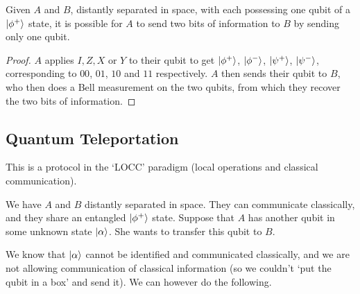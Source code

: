 \documentclass[a4paper]{article}
\begin{document}
\begin{theorem}
	Given $A$ and $B$, distantly separated in space, with each possessing one qubit of a $\ket{\phi^+}$ state, it is possible for $A$ to send two bits of information to $B$ by sending only one qubit.
\end{theorem}
\begin{proof}
	$A$ applies $I, Z, X$ or $Y$ to their qubit to get $\ket{\phi^+}$, $\ket{\phi^-}$, $\ket{\psi^+}$, $\ket{\psi^-}$, corresponding to $00$, $01$, $10$ and $11$ respectively. $A$ then sends their qubit to $B$, who then does a Bell measurement on the two qubits, from which they recover the two bits of information.
\end{proof}

\subsection{Quantum Teleportation}

This is a protocol in the `LOCC' paradigm (local operations and classical communication).

We have $A$ and $B$ distantly separated in space. They can communicate classically, and they share an entangled $\ket{\phi^+}$ state. Suppose that $A$ has another qubit in some unknown state $\ket{\alpha}$. She wants to transfer this qubit to $B$.

We know that $\ket{\alpha}$ cannot be identified and communicated classically, and we are not allowing communication of classical information (so we couldn't `put the qubit in a box' and send it). We can however do the following.
\end{document}
